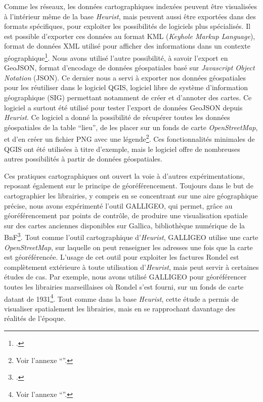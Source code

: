 Comme les réseaux, les données cartographiques indexées peuvent être visualisées à l'intérieur même de la base \emph{Heurist}, mais peuvent aussi être exportées dans des formats spécifiques, pour exploiter les possibilités de logiciels plus spécialisés. Il est possible d'exporter ces données au format KML (\emph{Keyhole Markup Language}), format de données XML utilisé pour afficher des informations dans un contexte géographique\footcite{francois_kml_2017}. Nous avons utilisé l'autre possibilité, à savoir l'export en GeoJSON, format d'encodage de données géospatiales basé sur \emph{Javascript Object Notation} (JSON). Ce dernier nous a servi à exporter nos données géospatiales pour les réutiliser dans le logiciel QGIS, logiciel libre de système d'information géographique (SIG) permettant notamment de créer et d'annoter des cartes. Ce logiciel a surtout été utilisé pour tester l'export de données GeoJSON depuis \emph{Heurist}. Ce logiciel a donné la possibilité de récupérer toutes les données géospatiales de la table \enquote{lieu}, de les placer sur un fonds de carte \emph{OpenStreetMap}, et d'en créer un fichier PNG avec une légende\footnote{Voir l'annexe \enquote{}.}. Ces fonctionnalités minimales de QGIS ont été utilisées à titre d'exemple, mais le logiciel offre de nombreuses autres possibilités à partir de données géospatiales. 


Ces pratiques cartographiques ont ouvert la voie à d'autres expérimentations, reposant également sur le principe de géoréférencement. Toujours dans le but de cartographier les librairies, y compris en se concentrant sur une aire géographique précise, nous avons expérimenté l'outil GALLIGEO, qui permet, grâce au géoréférencement par points de contrôle, de produire une visualisation spatiale sur des cartes anciennes disponibles sur Gallica, bibliothèque numérique de la BnF\footcite[p. 27]{hervieu_2024}. Tout comme l'outil cartographique d'\emph{Heurist}, GALLIGEO utilise une carte \emph{OpenStreetMap}, sur laquelle on peut renseigner les adresses une fois que la carte est géoréférencée. L'usage de cet outil pour exploiter les factures Rondel est complètement extérieure à toute utilisation d'\emph{Heurist}, mais peut servir à certaines études de cas. Par exemple, nous avons utilisé GALLIGEO pour géoréférencer toutes les librairies marseillaises où Rondel s'est fourni, sur un fonds de carte datant de 1931\footnote{Voir l'annexe \enquote{}.}. Tout comme dans la base \emph{Heurist}, cette étude a permis de visualiser spatialement les librairies, mais en se rapprochant davantage des réalités de l'époque. 

